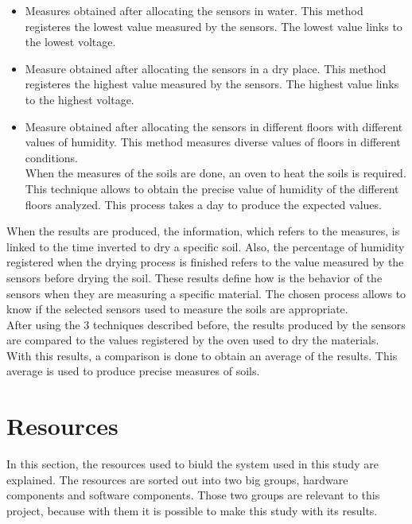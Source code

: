 \begin{itemize}

\item Measures obtained after allocating the sensors in water. This method registeres the lowest value measured by the sensors. The lowest value links to the lowest voltage.

\item Measure obtained after allocating the sensors in a dry place. This method registeres the highest value measured by the sensors. The highest value links to the highest voltage.

\item Measure obtained after allocating the sensors in different floors with different values of humidity. This method measures diverse values of floors in different conditions.\\

When the measures of the soils are done, an oven to heat the soils is required. This technique allows to obtain the precise value of humidity of the different floors analyzed. This process takes a day to produce the expected values.

\end{itemize}

When the results are produced, the information, which refers to the measures, is linked to the time inverted to dry a specific soil. Also, the percentage of humidity registered when the drying process is finished refers to the value measured by the sensors before drying the soil. These results define how is the behavior of the sensors when they are measuring a specific material. The chosen process allows to know if the selected sensors used to measure the soils are appropriate.\\

After using the 3 techniques described before, the results produced by the sensors are compared to the values registered by the oven used to dry the materials. With this results, a comparison is done to obtain an average of the results. This average is used to produce precise measures of soils.

\section{Resources}

In this section, the resources used to biuld the system used in this study are explained. The resources are sorted out into two big groups, hardware components and software components. Those two groups are relevant to this project, because with them it is possible to make this study with its results.

